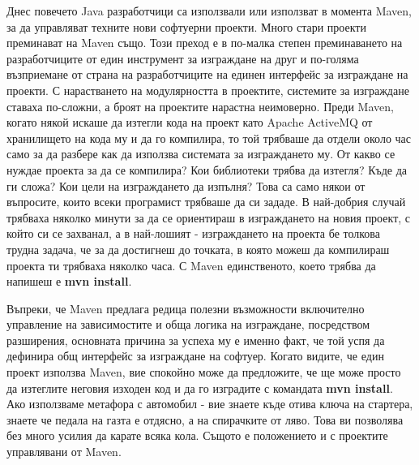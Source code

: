 Днес повечето Java разработчици са използвали или използват в момента
Maven, за да управляват техните нови софтуерни проекти. Много стари
проекти преминават на Maven също. Този преход е в по-малка степен
преминаването на разработчиците от един инструмент за изграждане на
друг и по-голяма възприемане от страна на разработчиците на единен
интерфейс за изграждане на проекти. С нарастването на модулярността в
проектите, системите за изграждане ставаха по-сложни, а броят на
проектите нарастна неимоверно. Преди Maven, когато някой искаше да
изтегли кода на проект като Apache ActiveMQ от хранилището на кода му
и да го компилира, то той трябваше да отдели около час само за да
разбере как да използва системата за изграждането му. От какво се
нуждае проекта за да се компилира? Кои библиотеки трябва да изтегля?
Къде да ги сложа? Кои цели на изграждането да изпълня? Това са само
някои от въпросите, които всеки програмист трябваше да си зададе. В
най-добрия случай трябваха няколко минути за да се ориентираш в
изграждането на новия проект, с който си се захванал, а в най-лошият -
изграждането на проекта бе толкова трудна задача, че за да достигнеш
до точката, в която можеш да компилираш проекта ти трябваха няколко
часа. С Maven единственото, което трябва да напишеш е \textbf{mvn
  install}.

Въпреки, че Maven предлага редица полезни възможности включително
управление на зависимостите и обща логика на изграждане, посредством
разширения, основната причина за успеха му е именно факт, че той успя
да дефинира общ интерфейс за изграждане на софтуер. Когато видите, че
един проект използва Maven, вие спокойно може да предложите, че ще
може просто да изтеглите неговия изходен код и да го изградите с
командата \textbf{mvn install}. Ако използваме метафора с автомобил -
вие знаете къде отива ключа на стартера, знаете че педала на газта е
отдясно, а на спирачките от ляво. Това ви позволява без много усилия
да карате всяка кола. Същото е положението и с проектите управлявани
от Maven.
